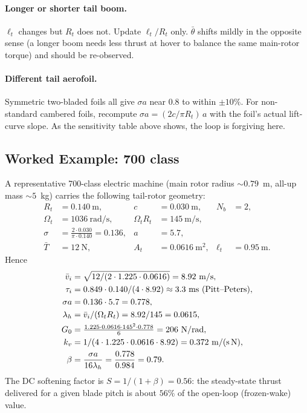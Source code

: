 \documentclass[11pt,a4paper]{article}
\newcommand{\OmegaT}{\Omega_t}
\newcommand{\Rt}{R_t}
\newcommand{\At}{A_t}
\newcommand{\bvi}{\bar{v}_i}
\newcommand{\bT}{\bar{T}}
\newcommand{\btheta}{\bar{\theta}}
\begin{document}
\paragraph{Longer or shorter tail boom.}
\(\ell_t\) changes but \(\Rt\) does not. Update \(\ell_t/\Rt\) only.
\(\btheta\) shifts mildly in the opposite sense (a longer boom needs
less thrust at hover to balance the same main-rotor torque) and
should be re-observed.

\paragraph{Different tail aerofoil.}
Symmetric two-bladed foils all give \(\sigma a\) near 0.8 to within
\(\pm 10\%\). For non-standard cambered foils, recompute
\(\sigma a=(2c/\pi\Rt)\,a\) with the foil's actual lift-curve slope.
As the sensitivity table above shows, the loop is forgiving here.

\subsection{Worked Example: 700 class}\label{ssec:worked_example}

A representative 700-class electric machine (main rotor radius
\(\sim 0.79\)~m, all-up mass \(\sim 5\)~kg) carries the following
tail-rotor geometry:
\begin{align*}
\Rt &= 0.140~\text{m}, & c &= 0.030~\text{m}, & N_b &= 2,\\
\OmegaT &= 1036~\text{rad/s}, & \OmegaT\Rt &= 145~\text{m/s},\\
\sigma &= \tfrac{2\cdot 0.030}{\pi\cdot 0.140} = 0.136, & a &= 5.7,\\
\bT &= 12~\text{N}, & \At &= 0.0616~\text{m}^2, & \ell_t &= 0.95~\text{m}.
\end{align*}
Hence
\begin{align*}
\bvi &= \sqrt{12/(2\cdot 1.225\cdot 0.0616)} = 8.92~\text{m/s},\\
\tau_i &= 0.849\cdot 0.140/(4\cdot 8.92) \approx 3.3~\text{ms (Pitt--Peters)},\\
\sigma a &= 0.136 \cdot 5.7 = 0.778,\\
\lambda_h &= \bvi/(\OmegaT\Rt) = 8.92/145 = 0.0615,\\
G_0 &= \tfrac{1.225\cdot 0.0616\cdot 145^2\cdot 0.778}{6} = 206~\text{N/rad},\\
k_v &= 1/(4\cdot 1.225\cdot 0.0616\cdot 8.92) = 0.372~\text{m/(s\,N)},\\
\beta &= \frac{\sigma a}{16\lambda_h} = \frac{0.778}{0.984} = 0.79.
\end{align*}
The DC softening factor is \(S = 1/(1+\beta) = 0.56\): the steady-state
thrust delivered for a given blade pitch is about \(56\%\) of the
open-loop (frozen-wake) value.
\end{document}
